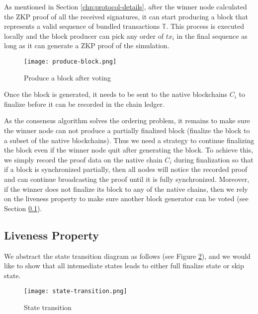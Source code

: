 As mentioned in Section \ref{chp:protocol-details}, after the winner node calculated the ZKP proof of all the received signatures, it can start producing a block that represents a valid sequence of bundled transactions $\mathbb{T}$. This process is executed locally and the block producer can pick any order of $tx_i$ in the final sequence as long as it can generate a ZKP proof of the simulation.

\begin{figure}[!ht]
\begin{center}
\texttt{[image: produce-block.png]}
\end{center}
\caption{Produce a block after voting}
\label{produce-block}
\end{figure}

Once the block is generated, it needs to be sent to the native blockchains $C_i$ to finalize before it can be recorded in the \dprotocol chain ledger. 

As the consensus algorithm solves the ordering problem, it remains to make sure the winner node can not produce a partially finalized block (finalize the block to a subset of the native blockchains). Thus we need a strategy to continue finalizing the block even if the winner node quit after generating the block. To achieve this, we simply record the proof data on the native chain $C_i$ during finalization so that if a block is synchronized partially, then all \dprotocol nodes will notice the recorded proof and can continue broadcasting the proof until it is fully synchronized. Moreover, if the winner does not finalize its block to any of the native chains, then we rely on the liveness property to make sure another block generator can be voted (see Section \ref{chp:sub:liveness}).

\subsection{Liveness Property}
\label{chp:sub:liveness}
We abstract the state transition diagram as follows (see Figure \ref{state-transition}), and we would like to show that all intemediate states leads to either full finalize state or skip state.
\begin{figure}[!ht]
\begin{center}
\texttt{[image: state-transition.png]}
\end{center}
\caption{State transition}
\label{state-transition}
\end{figure}

